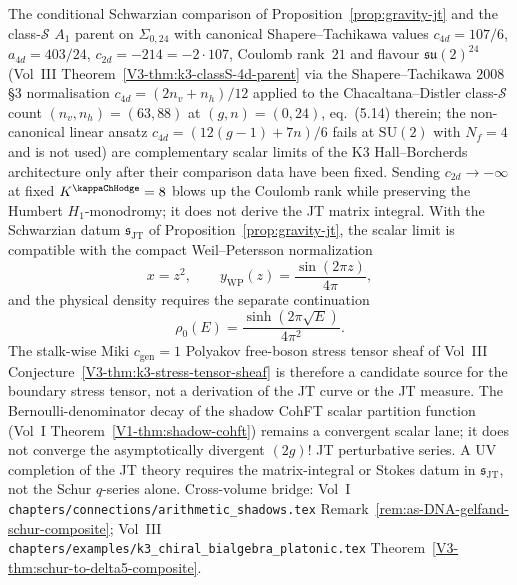 \begin{remark}
\label{rem:3dg-gelfand-jt-class-s-shadow}
The conditional Schwarzian comparison of
Proposition~\ref{prop:gravity-jt} and the class-$\mathcal{S}$ $A_1$
parent on $\Sigma_{0,24}$ with canonical
Shapere--Tachikawa values $c_{4d} = 107/6$, $a_{4d} = 403/24$,
$c_{2d} = -214 = -2\cdot 107$, Coulomb rank~$21$ and flavour
$\mathfrak{su}(2)^{24}$ (Vol~III
Theorem~\ref*{V3-thm:k3-classS-4d-parent} via the Shapere--Tachikawa
$2008$ \S 3 normalisation $c_{4d} = (2n_v + n_h)/12$ applied to the
Chacaltana--Distler class-$\mathcal S$ count
$(n_v, n_h) = (63, 88)$ at $(g, n) = (0, 24)$, eq.~(5.14) therein;
the non-canonical linear ansatz
$c_{4d} = (12(g-1) + 7n)/6$ fails at
$\mathrm{SU}(2)$ with $N_f = 4$ and is not used) are
complementary scalar limits of the K3 Hall--Borcherds architecture
only after their comparison data have been fixed. Sending
\(c_{2d}\to -\infty\) at fixed \(K^{\kappaChHodge}=8\) blows up the
Coulomb rank while preserving the Humbert \(H_1\)-monodromy; it does
not derive the JT matrix integral. With the Schwarzian datum
\(\mathfrak s_{\mathrm{JT}}\) of Proposition~\ref{prop:gravity-jt},
the scalar limit is compatible with the compact
Weil--Petersson normalization
\[
x=z^2,\qquad y_{\mathrm{WP}}(z)=\frac{\sin(2\pi z)}{4\pi},
\]
and the physical density requires the separate continuation
\[
\rho_0(E)=\frac{\sinh(2\pi\sqrt E)}{4\pi^2}.
\]
The stalk-wise Miki \(c_{\mathrm{gen}}=1\) Polyakov free-boson stress
tensor sheaf of Vol~III
Conjecture~\ref*{V3-thm:k3-stress-tensor-sheaf} is therefore a
candidate source for the boundary stress tensor, not a derivation of
the JT curve or the JT measure. The Bernoulli-denominator decay of the
shadow CohFT scalar partition function
(Vol~I Theorem~\ref{V1-thm:shadow-cohft}) remains a convergent scalar
lane; it does not converge the asymptotically divergent \((2g)!\) JT
perturbative series. A UV completion of the JT theory requires the
matrix-integral or Stokes datum in \(\mathfrak s_{\mathrm{JT}}\), not
the Schur \(q\)-series alone. Cross-volume bridge:
Vol~I \texttt{chapters/connections/arithmetic\_shadows.tex}
Remark~\ref*{rem:as-DNA-gelfand-schur-composite};
Vol~III \texttt{chapters/examples/k3\_chiral\_bialgebra\_platonic.tex}
Theorem~\ref*{V3-thm:schur-to-delta5-composite}.
\end{remark}


